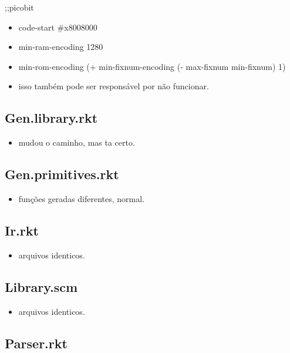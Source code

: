 \documentclass[11pt]{article}
\begin{document}
;;picobit 
\begin{itemize}
\item code-start \#x8008000
\item min-ram-encoding 1280
\item min-rom-encoding (+ min-fixnum-encoding (- max-fixnum min-fixnum) 1)

\item isso também pode ser responsável por não funcionar.
\end{itemize}

\subsection{Gen.library.rkt}
\label{sec-14-11}

\begin{itemize}
\item mudou o caminho, mas ta certo.
\end{itemize}

\subsection{Gen.primitives.rkt}
\label{sec-14-12}

\begin{itemize}
\item funções geradas diferentes, normal.
\end{itemize}

\subsection{Ir.rkt}
\label{sec-14-13}

\begin{itemize}
\item arquivos identicos.
\end{itemize}

\subsection{Library.scm}
\label{sec-14-14}

\begin{itemize}
\item arquivos identicos.
\end{itemize}

\subsection{Parser.rkt}
\label{sec-14-15}
\end{document}
